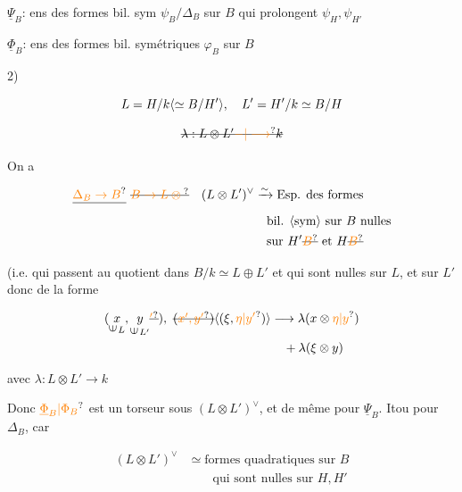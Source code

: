 $\underline{\Psi}_B$: \deleted{$(\unsure{\psi})$} ens des formes bil. sym $\psi_B/\Delta_B$ sur $B$
qui prolongent $\psi_H,\psi_{H'}$

$\underline{\Phi}_B$: \deleted{$(\varphi)$} ens des formes bil. symétriques $\varphi_B$ sur $B$


2)  

\[
L=H/k\inserted{\simeq B/H'},\quad L'=H'/k\simeq B/H
\]


\[
\deleted{\lambda:L\otimes L'\unsure{-|\longrightarrow} k}
\]


On a

\[
\begin{aligned}
\deleted{\unsure{\Delta_B\to B}}\ \deleted{\unsure{B\to L\otimes{}}}\quad
(L\otimes L')^\vee&\xrightarrow{\sim}\text{Esp. des formes}\\
&\quad\text{bil. \inserted{sym} sur }B\text{ nulles}\\
&\quad\text{sur }H'\deleted{\unsure{B}}\text{ et }H\deleted{\unsure{B}}
\end{aligned}
\]

(i.e. qui passent au
quotient dans $B/k\simeq L\oplus L'$ 
et qui sont nulles
sur $L$, et sur $L'$
donc de la forme

\[
\begin{aligned}
(\underset{\rotatebox{90}{$\in$}\,L}{x},\underset{\rotatebox{90}{$\in$}\,L'}{y}\deleted{\unsure{'}}),\
\deleted{(\unsure{x',y'})}\inserted{(\xi,\unsure{\eta|y'})}
 &\longrightarrow\lambda(x\otimes\unsure{\eta|y})\\
 &\quad+\lambda(\xi\otimes y)
\end{aligned}
\]

avec $\lambda:L\otimes L'\longrightarrow k$

Donc \deleted{$\Delta$}$\unsure{\underline{\Phi}_B|\Phi_B}$ est un torseur sous $(L\otimes L')^\vee$, et de
même pour $\underline{\Psi}_B$. Itou pour $\Delta_B$, car

\[
\begin{aligned}
(L\otimes L')^\vee&\simeq\text{formes quadratiques sur }B\\
&\qquad\text{qui sont nulles sur }H,H'
\end{aligned}
\]

